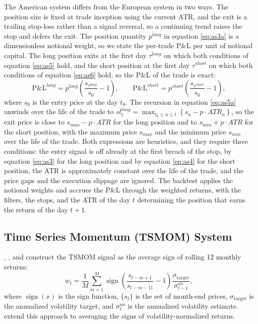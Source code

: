 \documentclass[hidelinks]{siamonline250211}
\DeclareMathOperator{\sgn}{sign}
\begin{document}
The American system differs from the European system in two ways. The position size is fixed at trade inception using the current ATR, and the exit is a trailing stop-loss rather than a signal reversal, so a continuing trend raises the stop and defers the exit. The position quantity $p^{long}$ in equation \eqref{eq:as3a} is a dimensionless notional weight, so we state the per-trade P\&L per unit of notional capital. The long position exits at the first day $\tau^{long}$ on which both conditions of equation \eqref{eq:as5} hold, and the short position at the first day $\tau^{short}$ on which both conditions of equation \eqref{eq:as6} hold, so the P\&L of the trade is exact:
\begin{equation} \label{eq:as7} 
	\text{P\&L}^{long} = p^{long} \left(\frac{s_{\tau^{long}}}{s_{0}} - 1  \right), \qquad \text{P\&L}^{short} = p^{short} \left(\frac{s_{\tau^{short}}}{s_{0}} - 1 \right),
\end{equation}
where $s_{0}$ is the entry price at the day $t_{0}$. The recursion in equation \eqref{eq:as5a} unwinds over the life of the trade to $sl^{long}_{t} = \max_{t_{0} \leq u \leq t}\left\{ s_{u} - p \cdot ATR_{u} \right\}$, so the exit price is close to $s_{max} - p \cdot ATR$ for the long position and to $s_{min} + p \cdot ATR$ for the short position, with the maximum price $s_{max}$ and the minimum price $s_{min}$ over the life of the trade. Both expressions are heuristics, and they require three conditions: the entry signal is off already at the first breach of the stop, by equation \eqref{eq:as3} for the long position and by equation \eqref{eq:as4} for the short position, the ATR is approximately constant over the life of the trade, and the price gaps and the execution slippage are ignored. The backtest applies the notional weights and accrues the P\&L through the weighted returns, with the filters, the stops, and the ATR of the day $t$ determining the position that earns the return of the day $t+1$.



\subsection{Time Series Momentum (TSMOM) System}


\cite{Moskowitz2012}, \cite{Hurst2013}, and \cite{Baltas2015} construct the TSMOM signal as the average sign of rolling 12 monthly returns:
\begin{equation} \label{eq:tsmom1} 
	w_{t} = \frac{1}{M} \sum^{M}_{m=1} \sgn\left(\frac{s_{t-m+1}}{s_{t-m-11}}-1\right) \frac{\sigma_{\mathrm{target}}}{\sigma^{an}_{t-1}},
\end{equation}
where $\sgn(x)$ is the sign function, $\{s_{t}\}$ is the set of month-end prices, $\sigma_{\mathrm{target}}$ is the annualized volatility target, and $\sigma^{an}_{t}$ is the annualized volatility estimate. \cite{Dudler2015} extend this approach to averaging the signs of volatility-normalized returns. 
\end{document}
